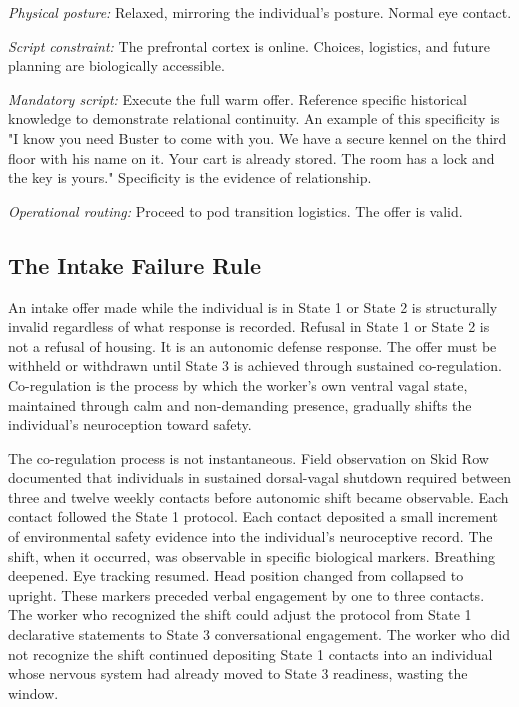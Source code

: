 \documentclass[12pt, letterpaper]{article}
\begin{document}
\textit{Physical posture:} Relaxed, mirroring the individual's posture. Normal eye contact.

\textit{Script constraint:} The prefrontal cortex is online. Choices, logistics, and future planning are biologically accessible.

\textit{Mandatory script:} Execute the full warm offer. Reference specific historical knowledge to demonstrate relational continuity. An example of this specificity is "I know you need Buster to come with you. We have a secure kennel on the third floor with his name on it. Your cart is already stored. The room has a lock and the key is yours." Specificity is the evidence of relationship.

\textit{Operational routing:} Proceed to pod transition logistics. The offer is valid.

\subsection{The Intake Failure Rule}

An intake offer made while the individual is in State 1 or State 2 is structurally invalid regardless of what response is recorded. Refusal in State 1 or State 2 is not a refusal of housing. It is an autonomic defense response. The offer must be withheld or withdrawn until State 3 is achieved through sustained co-regulation. Co-regulation is the process by which the worker's own ventral vagal state, maintained through calm and non-demanding presence, gradually shifts the individual's neuroception toward safety.

The co-regulation process is not instantaneous. Field observation on Skid Row documented that individuals in sustained dorsal-vagal shutdown required between three and twelve weekly contacts before autonomic shift became observable. Each contact followed the State 1 protocol. Each contact deposited a small increment of environmental safety evidence into the individual's neuroceptive record. The shift, when it occurred, was observable in specific biological markers. Breathing deepened. Eye tracking resumed. Head position changed from collapsed to upright. These markers preceded verbal engagement by one to three contacts. The worker who recognized the shift could adjust the protocol from State 1 declarative statements to State 3 conversational engagement. The worker who did not recognize the shift continued depositing State 1 contacts into an individual whose nervous system had already moved to State 3 readiness, wasting the window.
\end{document}
